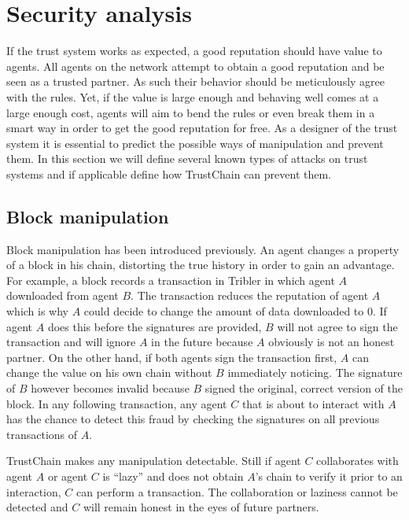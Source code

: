 \section{Security analysis}
\label{sec:attacks}
If the trust system works as expected, a good reputation should have value to agents. All agents on 
the network attempt to obtain a good reputation and be seen as a trusted partner. As such their 
behavior should be meticulously agree with the rules. Yet, if the value is large enough and behaving
well comes at a large enough cost, agents will aim to bend the rules or even break them in a smart 
way in order to get the good reputation for free. As a designer of the trust system it is essential
to predict the possible ways of manipulation and prevent them. In this section we will define several
known types of attacks on trust systems and if applicable define how TrustChain can prevent them.

\subsection{Block manipulation}
\label{sec:tampering}
Block manipulation has been introduced previously. An agent changes a property of a block in his 
chain, distorting the true history in order to gain an advantage. For example, a block records a 
transaction in Tribler in which agent $A$ downloaded from agent $B$. The transaction reduces the 
reputation of agent $A$ which is why $A$ could decide to change the amount of data downloaded to 0.
If agent $A$ does this before the signatures are provided, $B$ will not agree to sign the transaction
and will ignore $A$ in the future because $A$ obviously is not an honest partner. On the other hand,
if both agents sign the transaction first, $A$ can change the value on his own chain without $B$ 
immediately noticing. The signature of $B$ however becomes invalid because $B$ signed the original, 
correct version of the block. In any following transaction, any agent $C$ that is about to interact
with $A$ has the chance to detect this fraud by checking the signatures on all previous transactions
of $A$. 

TrustChain makes any manipulation detectable. Still if agent $C$ collaborates with agent $A$ or 
agent $C$ is ``lazy'' and does not obtain $A$'s chain to verify it prior to an interaction, $C$ can 
perform a transaction. The collaboration or laziness cannot be detected and $C$ will remain honest 
in the eyes of future partners.

